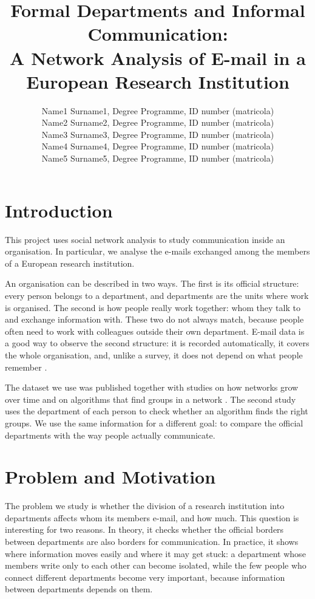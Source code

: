 \documentclass[12pt, a4paper]{article}
\author{Name1 Surname1, Degree Programme, ID number (matricola)
\\Name2 Surname2, Degree Programme, ID number (matricola)
\\Name3 Surname3, Degree Programme, ID number (matricola)
\\Name4 Surname4, Degree Programme, ID number (matricola)
\\Name5 Surname5, Degree Programme, ID number (matricola)}
\date{}
\title{Formal Departments and Informal Communication:\\
A Network Analysis of E-mail in a European Research Institution}
\begin{document}
\maketitle

\section{Introduction}
\label{introduction}

This project uses social network analysis to study communication inside an
organisation. In particular, we analyse the e-mails exchanged among the members
of a European research institution.

An organisation can be described in two ways. The first is its official
structure: every person belongs to a department, and departments are the units
where work is organised. The second is how people really work together: whom
they talk to and exchange information with. These two do not always match,
because people often need to work with colleagues outside their own department.
E-mail data is a good way to observe the second structure: it is recorded
automatically, it covers the whole organisation, and, unlike a survey, it does
not depend on what people remember \cite{borgatti2018}.

The dataset we use was published together with studies on how networks grow
over time \cite{leskovec2007} and on algorithms that find groups in a network
\cite{yin2017}. The second study uses the department of each person to check
whether an algorithm finds the right groups. We use the same information for a
different goal: to compare the official departments with the way people
actually communicate.

\section{Problem and Motivation}
\label{problem-and-motivation}

The problem we study is whether the division of a research institution into
departments affects whom its members e-mail, and how much. This question is
interesting for two reasons. In theory, it checks whether the official borders
between departments are also borders for communication. In practice, it shows
where information moves easily and where it may get stuck: a department whose
members write only to each other can become isolated, while the few people who
connect different departments become very important, because information
between departments depends on them.
\end{document}
